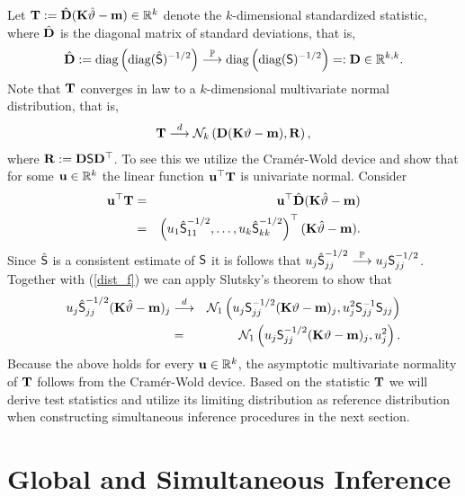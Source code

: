 \documentclass[12pt]{article}
\begin{document}
Let $\T := \hat{\D} (\K \hat{\vartheta} - \m) \in \R^k$ denote
the $k$-dimensional standardized statistic, where $\hat{\D}$ is the diagonal
matrix of standard deviations, that is,
\begin{eqnarray*}
\hat{\D} := \text{diag}\left(\text{diag}(\hat{\S})^{-1/2}\right) \cP
\text{diag}\left(\text{diag}(\S)^{-1/2}\right) =: \D \in \R^{k,k}.
\end{eqnarray*}
Note that $\T$ converges in law to a $k$-dimensional multivariate
normal distribution, that is,
\begin{eqnarray*}
\T \cL \N_k\left(\D(\K \vartheta - \m), \Cor\right),
\end{eqnarray*}
where $ \Cor := \D \S \D^\top$. To see this we utilize the
Cram{\'e}r-Wold device \citep[e.g., Theorem 5.1.8
in][]{Lehmann1999} and show that for some $\uu \in \R^k$
the linear function $\uu^\top \T$ is univariate normal. Consider
\begin{eqnarray*}
\uu^\top \T & = & \uu^\top \hat{\D} (\K \hat{\vartheta} - \m) \\
& = & \left(u_1 \hat{\S}_{11}^{-1/2}, \dots, u_k \hat{\S}_{kk}^{-1/2}\right)^\top(\K \hat{\vartheta} - \m).
\end{eqnarray*}
Since $\hat{\S}$ is a consistent estimate of $\S$ it
is follows that $u_j \hat{\S}_{jj}^{-1/2} \cP u_j \S_{jj}^{-1/2}$.
Together with (\ref{dist_f}) we can apply Slutsky's theorem \citep[Theorem 2.3.3
in][]{Lehmann1999} to show that
\begin{eqnarray*}
u_j \hat{\S}_{jj}^{-1/2} (\K \hat{\vartheta} - \m)_j & \cL &
\N_1\left(u_j \S_{jj}^{-1/2} (\K \vartheta - \m)_j, u_j^2 \S_{jj}^{-1} \S_{jj}\right) \\
& = & \N_1\left(u_j \S_{jj}^{-1/2} (\K \vartheta - \m)_j, u_j^2\right).
\end{eqnarray*}
Because the above holds for every $\uu \in \R^k$, the asymptotic multivariate
normality of $\T$ follows from the Cram{\'e}r-Wold device. 
Based on the statistic $\T$ we will derive test statistics 
and utilize its limiting distribution
as reference distribution when constructing
simultaneous inference procedures in the next section.

\section{Global and Simultaneous Inference} \label{siminf}
\end{document}
